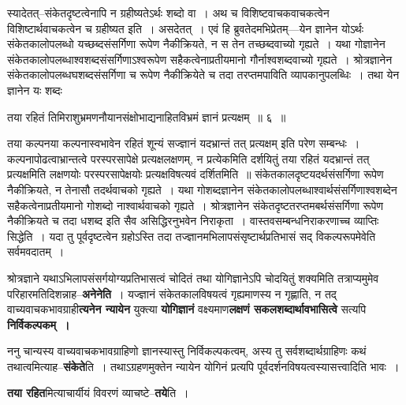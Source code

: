 \documentclass[article,12pt,a4paper]{memoir}
\begin{document}
	  \pstart स्यादेतत्--संकेतदृष्टत्वेनापि न ग्रहीष्यतेऽर्थः शब्दो वा । अथ च विशिष्टवाचकवाचकत्वेन विशिष्टार्थवाचकत्वेन च ग्रहीष्यत इति । असदेतत् । एवं हि ब्रुवतेदमभिप्रेतम्—येन ज्ञानेन योऽर्थः संकेतकालोपलब्धो यच्छब्दसंसर्गिणा रूपेण नैकीक्रियते, न स तेन तच्छब्दवाच्यो गृह्यते । यथा गोज्ञानेन संकेतकालोपलब्धाश्वशब्दसंसर्गिणाऽश्वरूपेण सहैकत्वेनाप्रतीयमानो गौर्नाश्वशब्दवाच्यो गृह्यते । श्रोत्रज्ञानेन संकेतकालोपलब्धघशब्दसंसर्गिणा च रूपेण नैकीक्रियेते च तदा तरप्तमपाविति व्यापकानुपलब्धिः । तथा येन ज्ञानेन यः शब्दः  \leavevmode{} 
	  
	तया रहितं तिमिराशुभ्रमणनौयानसंक्षोभाद्यनाहितविभ्रमं ज्ञानं प्रत्यक्षम् ॥ ६ ॥ 
	  
	तया कल्पनया कल्पनास्वभावेन रहितं शून्यं सज्ज्ञानं यदभ्रान्तं तत् प्रत्यक्षम् इति परेण सम्बन्धः । कल्पनापोढत्वाभ्रान्तत्वे परस्परसापेक्षे प्रत्यक्षलक्षणम्, न प्रत्येकमिति दर्शयितुं तया रहितं यदभ्रान्तं तत् प्रत्यक्षमिति लक्षणयोः परस्परसापेक्षयोः प्रत्यक्षविषत्यवं दर्शितमिति ॥ संकेतकालदृष्टयदर्थसंसर्गिणा रूपेण नैकीक्रियते, न तेनासौ तदर्थवाचको गृह्यते । यथा गोशब्दज्ञानेन संकेतकालोपलब्धाश्वार्थसंसर्गिणाश्वशब्देन सहैकत्वेनाप्रतीयमानो गोशब्दो नाश्वार्थवाचको गृह्यते । श्रोत्रज्ञानेन संकेतदृष्टतरप्तमबर्थसंसर्गिणा रूपेण नैकीक्रियते च तदा धशब्द इति सैव असिद्धिरनुभवेन निराकृता । वास्तवसम्बन्धनिराकरणाच्च व्याप्तिः सिद्धेति । यदा तु पूर्वदृष्टत्वेन ग्रहोऽस्ति तदा तज्ज्ञानमभिलापसंसृष्टार्थप्रतिभासं सद् विकल्परूपमेवेति सर्वमवदातम् ।
	\pend
      

	  \pstart श्रोत्रज्ञाने यथाऽभिलापसंसर्गयोग्यप्रतिभासत्वं चोदितं तथा योगिज्ञानेऽपि चोदयितुं शक्यमिति तत्राप्यमुमेव परिहारमतिदिशन्नाह--\textbf{अनेनेति} । यज्ज्ञानं संकेतकालविषयत्वं गृह्यमाणस्य न गृह्णाति, न तद् वाच्यवाचकभावग्राही\textbf{त्यनेन न्यायेन} युक्त्या \textbf{योगिज्ञानं} वक्ष्यमाण\textbf{लक्षणं सकलशब्दार्थावभासित्वे} सत्यपि \textbf{निर्विकल्पकम् ।}
	\pend
      

	  \pstart ननु चान्यस्य वाच्यवाचकभावग्राहिणो ज्ञानस्यास्तु निर्विकल्पकत्वम्, अस्य तु सर्वशब्दार्थग्राहिणः कथं तथात्वमित्याह--\textbf{संकेते}ति । तथाऽग्रहणमुक्तेन न्यायेन योगिनं प्रत्यपि पूर्वदर्शनविषयत्वस्यासत्त्वादिति भावः ।
	\pend
      

	  \pstart \textbf{तया रहित}मित्याचार्यीयं विवरणं व्याच\leavevmode{}ष्टे--\textbf{तये}ति ।
	\pend
      
\end{document}
